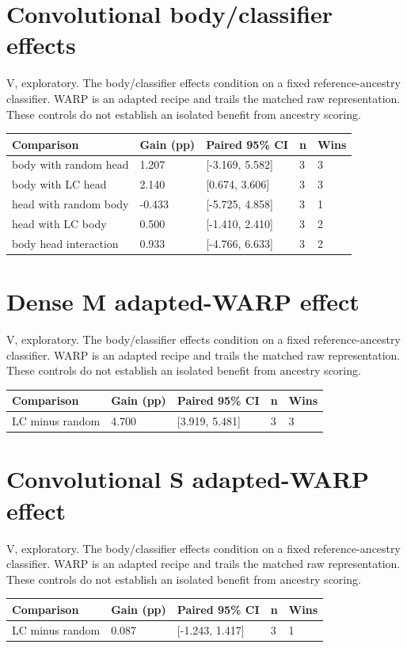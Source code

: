 \documentclass[10pt,a4paper]{article}
\begin{document}
\section*{Convolutional body/classifier effects}
V, exploratory. The body/classifier effects condition on a fixed reference-ancestry classifier. WARP is an adapted recipe and trails the matched raw representation. These controls do not establish an isolated benefit from ancestry scoring.
\par\bigskip
\setlength{\tabcolsep}{2pt}
\begin{tabular}{@{}p{57mm}p{47.0mm}p{47.0mm}p{47.0mm}p{47.0mm}@{}}
\toprule
Comparison & Gain (pp) & Paired 95\% CI & n & Wins \\ \midrule
body with random head & 1.207 & [-3.169, 5.582] & 3 & 3 \\
body with LC head & 2.140 & [0.674, 3.606] & 3 & 3 \\
head with random body & -0.433 & [-5.725, 4.858] & 3 & 1 \\
head with LC body & 0.500 & [-1.410, 2.410] & 3 & 2 \\
body head interaction & 0.933 & [-4.766, 6.633] & 3 & 2 \\
\bottomrule
\end{tabular}
\clearpage
\section*{Dense M adapted-WARP effect}
V, exploratory. The body/classifier effects condition on a fixed reference-ancestry classifier. WARP is an adapted recipe and trails the matched raw representation. These controls do not establish an isolated benefit from ancestry scoring.
\par\bigskip
\setlength{\tabcolsep}{2pt}
\begin{tabular}{@{}p{57mm}p{47.0mm}p{47.0mm}p{47.0mm}p{47.0mm}@{}}
\toprule
Comparison & Gain (pp) & Paired 95\% CI & n & Wins \\ \midrule
LC minus random & 4.700 & [3.919, 5.481] & 3 & 3 \\
\bottomrule
\end{tabular}
\clearpage
\section*{Convolutional S adapted-WARP effect}
V, exploratory. The body/classifier effects condition on a fixed reference-ancestry classifier. WARP is an adapted recipe and trails the matched raw representation. These controls do not establish an isolated benefit from ancestry scoring.
\par\bigskip
\setlength{\tabcolsep}{2pt}
\begin{tabular}{@{}p{57mm}p{47.0mm}p{47.0mm}p{47.0mm}p{47.0mm}@{}}
\toprule
Comparison & Gain (pp) & Paired 95\% CI & n & Wins \\ \midrule
LC minus random & 0.087 & [-1.243, 1.417] & 3 & 1 \\
\bottomrule
\end{tabular}
\clearpage
\end{document}
